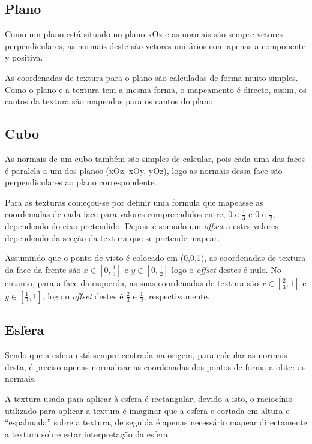 \documentclass[a4paper]{article}
\begin{document}
\subsection{Plano}
Como um plano está situado no plano xOz e as normais são sempre vetores
perpendiculares, as normais deste são vetores unitários com apenas a componente
y positiva.

As coordenadas de textura para o plano são calculadas de forma
muito simples. Como o plano e a textura tem a mesma forma, o mapeamento é
directo, assim, os cantos da textura são mapeados para os cantos do plano.

\subsection{Cubo}
As normais de um cubo também são simples de calcular, pois cada uma das faces é
paralela a um dos planos (xOz, xOy, yOz), logo as normais dessa face são
perpendiculares ao plano correspondente.

Para as texturas começou-se por definir uma formula que mapeasse as coordenadas
de cada face para valores compreendidos entre, 0 e $\frac{1}{3}$ e 0 e
$\frac{1}{2}$, dependendo do eixo pretendido. Depois é somado um
\textit{offset} a estes valores dependendo da secção da textura que se pretende
mapear.

Assumindo que o ponto de visto é colocado em (0,0,1), as coordenadas de textura
da face da frente são $x \in [0,\frac{1}{3}]$ e $y \in [0,\frac{1}{2}]$ logo o
\textit{offset} destes é nulo. No entanto, para a face da esquerda, as suas
coordenadas de textura são $x \in [\frac{2}{3},1]$ e $y \in [\frac{1}{2},1]$,
logo o \textit{offset} destes é $\frac{2}{3}$ e $\frac{1}{2}$, respectivamente.


\subsection{Esfera}\label{sec:esfera}
Sendo que a esfera está sempre centrada na origem, para calcular as normais
desta, é preciso apenas normalizar as coordenadas dos pontos de forma a obter
as normais.

A textura usada para aplicar à esfera é rectangular, devido a isto, o raciocínio
utilizado para aplicar a textura é imaginar que a esfera e cortada em altura e
``espalmada'' sobre a textura, de seguida é apenas necessário mapear
directamente a textura sobre estar interpretação da esfera.
\end{document}
